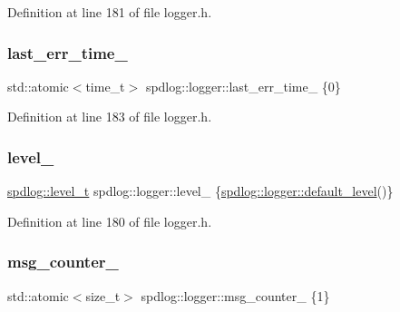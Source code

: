 Definition at line 181 of file logger.\+h.

\mbox{\label{classspdlog_1_1logger_a00677a369b642aec9e8428374ee09df6}} 
\subsubsection{\texorpdfstring{last\+\_\+err\+\_\+time\+\_\+}{last\_err\_time\_}}
{\footnotesize\ttfamily std\+::atomic$<$time\+\_\+t$>$ spdlog\+::logger\+::last\+\_\+err\+\_\+time\+\_\+ \{0\}\hspace{0.3cm}{\ttfamily [protected]}}



Definition at line 183 of file logger.\+h.

\mbox{\label{classspdlog_1_1logger_af167b5b45a369b3cef019b40a87ed71d}} 
\subsubsection{\texorpdfstring{level\+\_\+}{level\_}}
{\footnotesize\ttfamily \hyperlink{namespacespdlog_a8585bf495310a6ce695191739351709b}{spdlog\+::level\+\_\+t} spdlog\+::logger\+::level\+\_\+ \{\hyperlink{classspdlog_1_1logger_a0d0307a6501a9f56689c386a006991fe}{spdlog\+::logger\+::default\+\_\+level}()\}\hspace{0.3cm}{\ttfamily [protected]}}



Definition at line 180 of file logger.\+h.

\mbox{\label{classspdlog_1_1logger_a7ef1e291dcb766951fc5c25f110d775f}} 
\subsubsection{\texorpdfstring{msg\+\_\+counter\+\_\+}{msg\_counter\_}}
{\footnotesize\ttfamily std\+::atomic$<$size\+\_\+t$>$ spdlog\+::logger\+::msg\+\_\+counter\+\_\+ \{1\}\hspace{0.3cm}{\ttfamily [protected]}}



